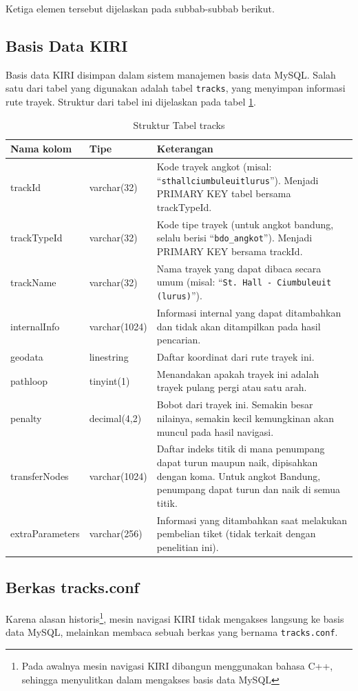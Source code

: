 Ketiga elemen tersebut dijelaskan pada subbab-subbab berikut.

\subsection{Basis Data KIRI}
Basis data KIRI disimpan dalam sistem manajemen basis data MySQL. Salah satu dari tabel yang digunakan adalah tabel \texttt{tracks}, yang menyimpan informasi rute trayek. Struktur dari tabel ini dijelaskan pada tabel \ref{tab:2_struktur_tabel_tracks}.

\begin{table}
	\caption{Struktur Tabel tracks}
	\label{tab:2_struktur_tabel_tracks}
	\begin{tabular}{|p{3cm}|p{2.5cm}|p{9.5cm}|}
		\hline
		Nama kolom & Tipe & Keterangan \\
		\hline
		trackId & varchar(32) & Kode trayek angkot (misal: ``\texttt{sthallciumbuleuitlurus}''). Menjadi PRIMARY KEY tabel bersama trackTypeId. \\
		trackTypeId & varchar(32) & Kode tipe trayek (untuk angkot bandung, selalu berisi ``\texttt{bdo\_angkot}''). Menjadi PRIMARY KEY bersama trackId. \\
		trackName & varchar(32) & Nama trayek yang dapat dibaca secara umum (misal: ``\texttt{St. Hall - Ciumbuleuit (lurus)}''). \\
		internalInfo & varchar(1024) & Informasi internal yang dapat ditambahkan dan tidak akan ditampilkan pada hasil pencarian. \\
		geodata & linestring & Daftar koordinat dari rute trayek ini. \\
		pathloop & tinyint(1) & Menandakan apakah trayek ini adalah trayek pulang pergi atau satu arah. \\
		penalty & decimal(4,2) & Bobot dari trayek ini. Semakin besar nilainya, semakin kecil kemungkinan akan muncul pada hasil navigasi. \\
		transferNodes & varchar(1024) & Daftar indeks titik di mana penumpang dapat turun maupun naik, dipisahkan dengan koma. Untuk angkot Bandung, penumpang dapat turun dan naik di semua titik. \\
		extraParameters & varchar(256) & Informasi yang ditambahkan saat melakukan pembelian tiket (tidak terkait dengan penelitian ini). \\
		\hline
	\end{tabular}
\end{table}

\subsection{Berkas tracks.conf}
Karena alasan historis\footnote{Pada awalnya mesin navigasi KIRI dibangun menggunakan bahasa C++, sehingga menyulitkan dalam mengakses basis data MySQL}, mesin navigasi KIRI tidak mengakses langsung ke basis data MySQL, melainkan membaca sebuah berkas yang bernama \texttt{tracks.conf}.


